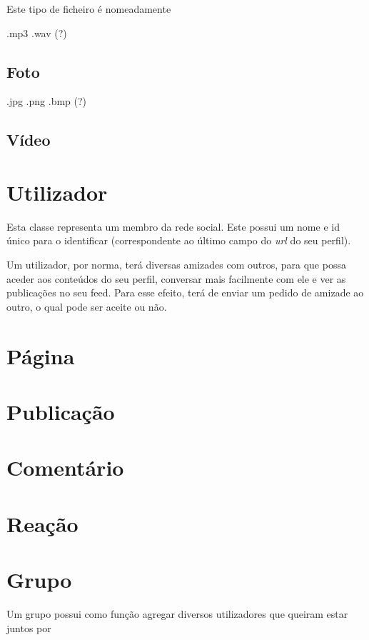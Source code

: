 \documentclass{report}
\begin{document}
Este tipo de ficheiro é nomeadamente 

.mp3 .wav (?)

\subsection{Foto}

.jpg .png .bmp (?)

\subsection{Vídeo}

\section{Utilizador}

Esta classe representa um membro da rede social. Este possui um nome e id único para o identificar (correspondente ao último campo do \textit{url} do seu perfil). \par

Um utilizador, por norma, terá diversas amizades com outros, para que possa aceder aos conteúdos do seu perfil, conversar mais facilmente com ele e ver as publicações no seu feed. Para esse efeito, terá de enviar um pedido de amizade ao outro, o qual pode ser aceite ou não.

\section{Página}

\section{Publicação}

\section{Comentário}

\section{Reação}

\section{Grupo}

Um grupo possui como função agregar diversos utilizadores que queiram estar juntos por
\end{document}
